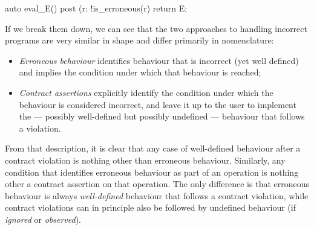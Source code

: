 \begin{codeblock}
auto eval_E() 
post (r: !is_erroneous(r) { 
  return E;
}
\end{codeblock}

If we break them down, we can see that the two approaches to handling incorrect programs are very similar in shape and differ primarily in nomenclature:
\begin{itemize}
\item{\emph{Erroneous behaviour} identifies behaviour that is incorrect (yet well defined) and implies the condition under which that behaviour is reached;}
\item{\emph{Contract assertions} explicitly identify the condition under which the behaviour is considered incorrect, and leave it up to the user to implement the --- possibly well-defined but possibly undefined --- behaviour that follows a violation.}
\end{itemize}
From that description, it is clear that any case of well-defined behaviour after a contract violation is nothing other than erroneous behaviour.  Similarly, any condition that identifies erroneous behaviour as part of an operation is nothing other a contract assertion on that operation. The only difference is that erroneous behaviour is always \emph{well-defined} behaviour that follows a contract violation, while contract violations can in principle also be followed by undefined behaviour (if \emph{ignored} or \emph{observed}).

